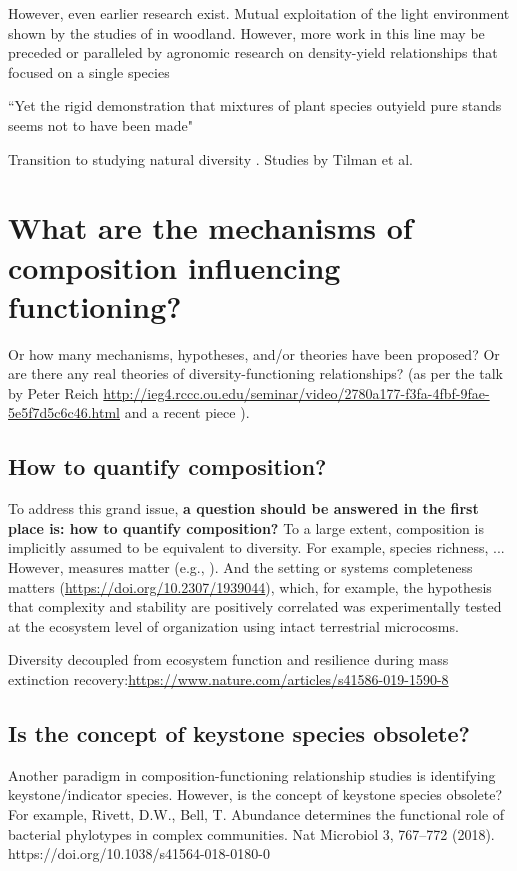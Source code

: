 \documentclass[letterpaper, 10pt]{article}
\begin{document}
However, even earlier research exist. Mutual exploitation of the light environment shown by the studies of \citet{salisbury1916oak} in woodland. However, more work in this line may be preceded or paralleled by agronomic research on density-yield relationships that focused on a single species \citep{harperdarwinian} 

``Yet the rigid demonstration that mixtures of plant species outyield pure stands seems not to have been made" \citep{harperdarwinian}

Transition to studying natural diversity \citep{levin1999fragile}. Studies by Tilman et al. 


\section{What are the mechanisms of composition influencing functioning?}
Or how many mechanisms, hypotheses, and/or theories have been proposed? Or are there any real theories of diversity-functioning relationships? (as per the talk by Peter Reich \url{http://ieg4.rccc.ou.edu/seminar/video/2780a177-f3fa-4fbf-9fae-5e5f7d5c6c46.html} and a recent piece \citep{dunn2019biodiversity}).
\subsection{How to quantify composition?}
To address this grand issue, \textbf{a question should be answered in the first place is: how to quantify composition?} 
To a large extent, composition is implicitly assumed to be equivalent to diversity. For example, species richness, ... However, measures matter (e.g., \citealp{schuldt2017belowground}). And the setting or systems completeness matters (\url{https://doi.org/10.2307/1939044}), which, for example, the hypothesis that complexity and stability are positively correlated was experimentally tested at the ecosystem level of organization using intact terrestrial microcosms.

Diversity decoupled from ecosystem function and resilience during mass extinction recovery:\url{https://www.nature.com/articles/s41586-019-1590-8}

\subsection{Is the concept of keystone species obsolete?}
Another paradigm in composition-functioning relationship studies is identifying keystone/indicator species. However, is the concept of keystone species obsolete? For example, Rivett, D.W., Bell, T. Abundance determines the functional role of bacterial phylotypes in complex communities. Nat Microbiol 3, 767–772 (2018). https://doi.org/10.1038/s41564-018-0180-0
\end{document}
